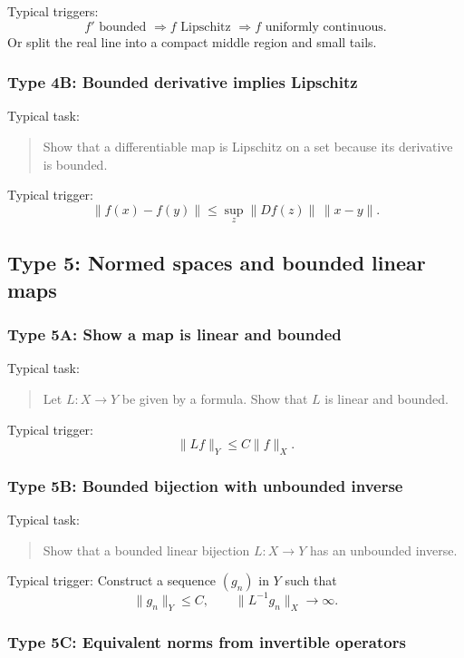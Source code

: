 Typical triggers:
\[
    f' \text{ bounded } \Rightarrow f \text{ Lipschitz } \Rightarrow f \text{ uniformly continuous}.
\]
Or split the real line into a compact middle region and small tails.

\subsubsection*{Type 4B: Bounded derivative implies Lipschitz}

Typical task:
\begin{quote}
    Show that a differentiable map is Lipschitz on a set because its derivative is bounded.
\end{quote}

Typical trigger:
\[
    \|f(x)-f(y)\|
    \leq
    \sup_{z}\|Df(z)\|\,\|x-y\|.
\]

\subsection{Type 5: Normed spaces and bounded linear maps}

\subsubsection*{Type 5A: Show a map is linear and bounded}

Typical task:
\begin{quote}
    Let $L:X\to Y$ be given by a formula. Show that $L$ is linear and bounded.
\end{quote}

Typical trigger:
\[
    \|Lf\|_Y\leq C\|f\|_X.
\]

\subsubsection*{Type 5B: Bounded bijection with unbounded inverse}

Typical task:
\begin{quote}
    Show that a bounded linear bijection $L:X\to Y$ has an unbounded inverse.
\end{quote}

Typical trigger: Construct a sequence $(g_n)$ in $Y$ such that
\[
    \|g_n\|_Y \leq C,
    \qquad
    \|L^{-1}g_n\|_X\to\infty.
\]

\subsubsection*{Type 5C: Equivalent norms from invertible operators}

